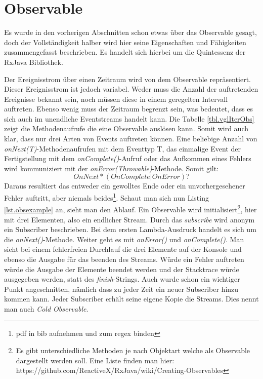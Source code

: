\section{Observable}
Es wurde in den vorherigen Abschnitten schon etwas über das Observable gesagt, doch der Vollständigkeit halber wird hier seine Eigenschaften und Fähigkeiten zusammengefasst beschrieben. Es handelt sich hierbei um die Quintessenz der RxJava Bibliothek.

Der Ereignisstrom über einen Zeitraum wird von dem Observable repräsentiert. Dieser Ereignisstrom ist jedoch variabel. Weder muss die Anzahl der auftretenden Ereignisse bekannt sein, noch müssen diese in einem geregelten Intervall auftreten. Ebenso wenig muss der Zeitraum begrenzt sein, was bedeutet, dass es sich auch im unendliche Eventstreams handelt kann. Die Tabelle \ref{tbl.vglIterObs} zeigt die Methodenaufrufe die eine Observable auslösen kann. Somit wird auch klar, dass nur drei Arten von Events auftreten können. Eine beliebige Anzahl von \textit{onNext(T)}-Methodenaufrufen mit dem Eventtyp T, das einmalige Event der Fertigstellung mit dem \textit{onComplete()}-Aufruf oder das Aufkommen eines Fehlers wird kommuniziert mit der \textit{onError(Throwable)}-Methode. Somit gilt: 
\begin{displaymath}
	OnNext*(OnComplete | OnError)?
\end{displaymath}
Daraus resultiert das entweder ein gewolltes Ende oder ein unvorhergesehener Fehler auftritt, aber niemals beides\footnote{pdf in bib aufnehmen und zum regex binden}. Schaut man sich nun Listing \ref{lst.obsexample} an, sieht man den Ablauf. Ein Observable wird initialisiert\footnote{Es gibt unterschiedliche Methoden je nach Objektart welche als Observable dargestellt werden soll. Eine Liste finden man hier: https://github.com/ReactiveX/RxJava/wiki/Creating-Observables}, hier mit drei Elementen, also ein endlicher Stream. Durch das \textit{subscribe} wird anonym ein Subscriber beschrieben. Bei dem ersten Lambda-Ausdruck handelt es sich um die \textit{onNext()}-Methode. Weiter geht es mit \textit{onError()} und \textit{onComplete()}. Man sieht bei einem fehlerfreien Durchlauf die drei Elemente auf der Konsole und ebenso die Ausgabe für das beenden des Streams. Würde ein Fehler auftreten würde die Ausgabe der Elemente beendet werden und der Stacktrace würde ausgegeben werden, statt des \textit{finish}-Strings. Auch wurde schon ein wichtiger Punkt angeschnitten, nämlich dass zu jeder Zeit ein neuer Subscriber hinzu kommen kann. Jeder Subscriber erhält seine eigene Kopie die Streams. Dies nennt man auch \textit{Cold Observable}.
